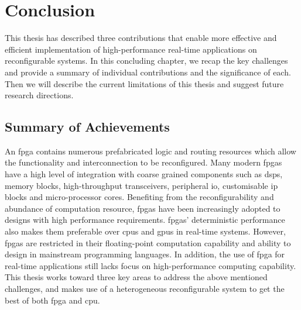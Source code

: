 
\chapter{Conclusion}

\label{ch:conclusion}

This thesis has described three contributions that enable more effective and efficient implementation of high-performance real-time applications on reconfigurable systems.
In this concluding chapter, we recap the key challenges and provide a summary of individual contributions and the significance of each.
Then we will describe the current limitations of this thesis and suggest future research directions.

\section{Summary of Achievements}

An \gls{fpga} contains numerous prefabricated logic and routing resources which allow the functionality and interconnection to be reconfigured.
Many modern \glspl{fpga} have a high level of integration with coarse grained components such as \glspl{dsp}, memory blocks, high-throughput transceivers, peripheral \gls{io}, customisable \gls{ip} blocks and micro-processor cores.
Benefiting from the reconfigurability and abundance of computation resource, \glspl{fpga} have been increasingly adopted to designs with high performance requirements.
\glspl{fpga}' deterministic performance also makes them preferable over \glspl{cpu} and \glspl{gpu} in real-time systems.
However, \glspl{fpga} are restricted in their floating-point computation capability and ability to design in mainstream programming languages.
In addition, the use of \gls{fpga} for real-time applications still lacks focus on high-performance computing capability.
This thesis works toward three key areas to address the above mentioned challenges, and makes use of a heterogeneous reconfigurable system to get the best of both \gls{fpga} and \gls{cpu}.

